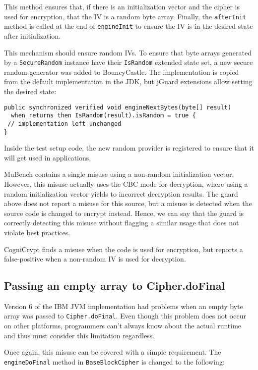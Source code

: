 \documentclass{article}
\begin{document}
This method ensures that, if there is an initialization vector and the cipher is used
for encryption, that the IV is a random byte array.
Finally, the \texttt{afterInit} method is called at the end of \texttt{engineInit} to
ensure the IV is in the desired state after initialization.

This mechanism should ensure random IVs.
To ensure that byte arrays generated by a \texttt{SecureRandom} instance have their
\texttt{IsRandom} extended state set, a new secure random generator was added to
BouncyCastle. The implementation is copied from the default implementation in the JDK,
but jGuard extensions allow setting the desired state:

\begin{lstlisting}[style=jGuard]
public synchronized verified void engineNextBytes(byte[] result)
  when returns then IsRandom(result).isRandom = true {
 // implementation left unchanged
}
\end{lstlisting}

Inside the test setup code, the new random provider is registered to ensure that
it will get used in applications.

MuBench contains a single misuse using a non-random initialization vector.
However, this misuse actually uses the CBC mode for decryption, where using a random
initialization vector yields to incorrect decryption results.
The guard above does not report a misuse for this source, but a misuse is detected when the source code
is changed to encrypt instead.
Hence, we can say that the guard is correctly detecting this misuse without flagging a
similar usage that does not violate best practices.

CogniCrypt finds a misuse when the code is used for encryption, but reports a false-positive
when a non-random IV is used for decryption.

\subsection{Passing an empty array to Cipher.doFinal}

Version 6 of the IBM JVM implementation had problems when an empty byte array was
passed to \texttt{Cipher.do\-Final}.
Even though this problem does not occur on other platforms, programmers can't always know
about the actual runtime and thus must consider this limitation regardless.

Once again, this misuse can be covered with a simple requirement.
The \texttt{engineDoFinal} method in \texttt{BaseBlockCipher} is changed to the
following:
\end{document}
